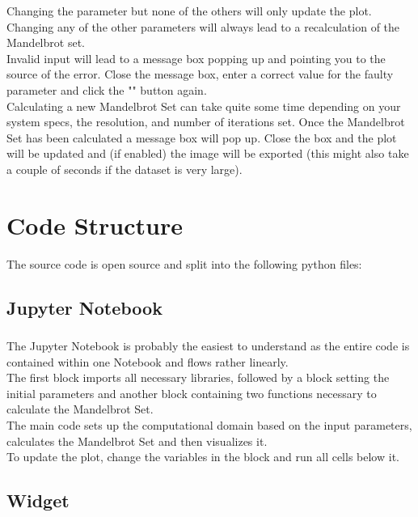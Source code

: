 \documentclass[
  12pt,					%
  a4paper,				%
  twoside,				%
]{report}
\begin{document}
Changing the {} parameter but none of the others will only update the plot. Changing any of the other parameters will always lead to a recalculation of the Mandelbrot set.\\

Invalid input will lead to a message box popping up and pointing you to the source of the error. Close the message box, enter a correct value for the faulty parameter and click the "{}" button again.\\

Calculating a new Mandelbrot Set can take quite some time depending on your system specs, the resolution, and number of iterations set. Once the Mandelbrot Set has been calculated a message box will pop up. Close the box and the plot will be updated and (if enabled) the image will be exported (this might also take a couple of seconds if the dataset is very large).




\section{Code Structure}

The {} source code is open source and split into the following python files:

\subsection{Jupyter Notebook}

\subsubsection{{}}
The Jupyter Notebook is probably the easiest to understand as the entire code is contained within one Notebook and flows rather linearly.\\
The first block imports all necessary libraries, followed by a block setting the initial parameters and another block containing two functions necessary to calculate the Mandelbrot Set.\\
The main code sets up the computational domain based on the input parameters, calculates the Mandelbrot Set and then visualizes it.\\
To update the plot, change the variables in the {} block and run all cells below it.

\subsection{Widget}
\end{document}
